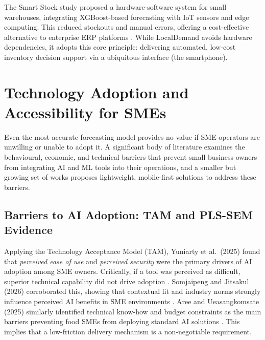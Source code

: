 \documentclass[conference]{IEEEtran}
\begin{document}
The Smart Stock study proposed a hardware-software system for small 
warehouses, integrating XGBoost-based forecasting with IoT sensors and 
edge computing. This reduced stockouts and manual errors, offering a 
cost-effective alternative to enterprise ERP platforms \cite{smartstock}. 
While LocalDemand avoids hardware dependencies, it adopts this core 
principle: delivering automated, low-cost inventory decision support via 
a ubiquitous interface (the smartphone).

\section{Technology Adoption and Accessibility for SMEs}

Even the most accurate forecasting model provides no value if SME
operators are unwilling or unable to adopt it. A significant body of
literature examines the behavioural, economic, and technical barriers
that prevent small business owners from integrating AI and ML tools into
their operations, and a smaller but growing set of works proposes
lightweight, mobile-first solutions to address these barriers.

\subsection{Barriers to AI Adoption: TAM and PLS-SEM Evidence}

Applying the Technology Acceptance Model (TAM), Yuniarty et al.\ (2025) 
found that \emph{perceived ease of use} and \emph{perceived security} were 
the primary drivers of AI adoption among SME owners. Critically, if a tool 
was perceived as difficult, superior technical capability did not drive 
adoption \cite{yuniarty2025}. Somjaipeng and Jitsakul (2026) corroborated 
this, showing that contextual fit and industry norms strongly influence 
perceived AI benefits in SME environments \cite{somjaipeng2026}. Aree and 
Ueasangkomsate (2025) similarly 
identified technical know-how and budget constraints as the main barriers 
preventing food SMEs from deploying standard AI solutions \cite{aree2025}. 
This implies that a low-friction delivery mechanism is a non-negotiable 
requirement.

\end{document}
